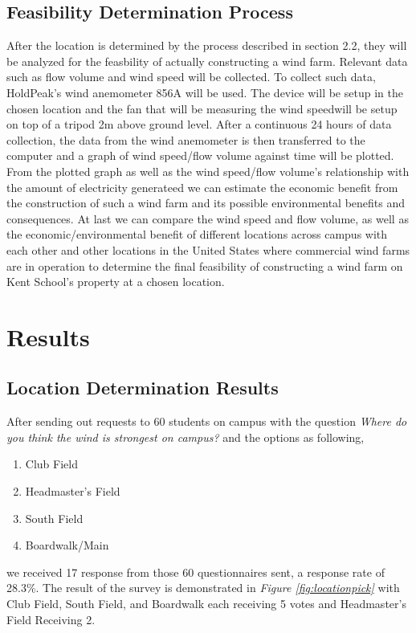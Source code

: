 \documentclass[review]{elsarticle}
\begin{document}
\subsection{Feasibility Determination Process}
\label{sec:methods:feasdeterprocess}
After the location is determined by the process described in section 2.2, they will be analyzed for the feasbility of actually constructing a wind farm. Relevant data 
such as flow volume and wind speed will be collected. To collect such data, HoldPeak's wind anemometer 856A will be used. The device will be setup in the chosen location 
and the fan that will be measuring the wind speedwill be setup on top of a tripod 2m above ground level. After a continuous 24 hours of data collection, the data from the 
wind anemometer is then transferred to the computer and a graph of wind speed/flow volume against time will be plotted.
\\\indent From the plotted graph as well as the wind speed/flow volume's relationship with the amount of electricity generateed we can estimate the economic benefit from 
the construction of such a wind farm and its possible environmental benefits and consequences. At last we can compare the wind speed and flow volume, as well as the 
economic/environmental benefit of different locations across campus with each other and other locations in the United States where commercial wind farms are in operation 
to determine the final feasibility of constructing a wind farm on Kent School's property at a chosen location.



\section{Results}
\label{sec:results}
\subsection{Location Determination Results}
\label{sec:results:locdeterresults}
After sending out requests to 60 students on campus with the question \textit{Where do you think the wind is strongest on campus?} and the options as following,
\begin{enumerate}
    \item {Club Field}
    \item {Headmaster's Field}
    \item {South Field}
    \item {Boardwalk/Main}   
\end{enumerate}
we received 17 response from those 60 questionnaires sent, a response rate of 28.3\%. The result of the survey is demonstrated in \textit{Figure \ref{fig:locationpick}} with Club Field, South Field, and Boardwalk each receiving 5 votes and Headmaster's Field Receiving 2. 
\end{document}
